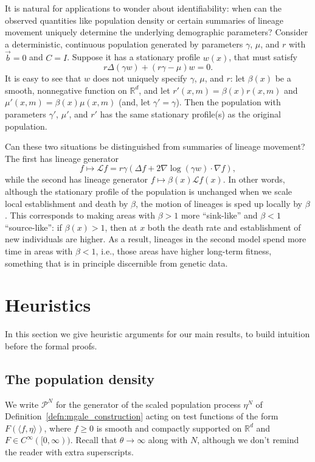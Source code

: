 \documentclass[12pt]{article}
\newcommand{\IR}{\mathbb R}
\newcommand{\grad}{\nabla}
\newcommand{\meanq}{\vec b}    %
\newcommand{\covq}{C}     %
\newcommand{\Lgen}{\mathcal{L}}    %
\newcommand{\Pgen}{\mathcal{P}}    %
\begin{document}
It is natural for applications to wonder about identifiability:
when can the observed quantities like population density
or certain summaries of lineage movement uniquely determine
the underlying demographic parameters?
Consider a deterministic,
continuous population generated by parameters $\gamma$, $\mu$, and $r$
with $\meanq = 0$ and $\covq = I$.
Suppose it has a stationary profile $w(x)$, that must satisfy
$$
   r \Delta(\gamma w) + (r \gamma - \mu) w = 0 .
$$
It is easy to see that $w$ does not uniquely specify $\gamma$, $\mu$, and $r$:
let $\beta(x)$ be a smooth, nonnegative function on $\IR^d$,
and let $r'(x, m) = \beta(x) r(x, m)$ and $\mu'(x, m) = \beta(x) \mu(x, m)$
(and, let $\gamma' = \gamma$).
Then the population with parameters $\gamma'$, $\mu'$, and $r'$
has the same stationary profile(s) as the original population.

Can these two situations be distinguished from summaries of lineage movement?
The first has lineage generator
\[
    f \mapsto \Lgen f = r \gamma \left( \Delta f + 2 \grad \log(\gamma w) \cdot \grad f \right),
\]
while the second has lineage generator $f \mapsto \beta(x) \Lgen f(x)$.
In other words,
although the stationary profile of the population is unchanged when we scale
local establishment and death by $\beta$,
the motion of lineages is sped up locally by $\beta$.
This corresponds to making areas with $\beta > 1$ more ``sink-like'' and $\beta < 1$ ``source-like'':
if $\beta(x) > 1$, then at $x$ both the death rate and establishment of new individuals are higher.
As a result, lineages in the second model spend more time in areas with $\beta < 1$,
i.e., those areas have higher long-term fitness,
something that is in principle discernible from genetic data.


\section{Heuristics}
    \label{sec:heuristics}

In this section we give heuristic arguments for our main results,
to build intuition before the formal proofs.

\subsection{The population density}
    \label{sec:population_heuristics}

We write $\Pgen^N$
for the generator of the scaled population process $\eta^N$
of Definition~\ref{defn:mgale_construction}
acting on test functions of the form $F( \langle f, \eta \rangle )$,
where $f \geq 0$ is smooth and compactly supported on $\IR^d$ and 
$F \in C^\infty ([0,\infty))$.
Recall that $\theta \to \infty$ along with $N$,
although we don't remind the reader with extra superscripts.
\end{document}
